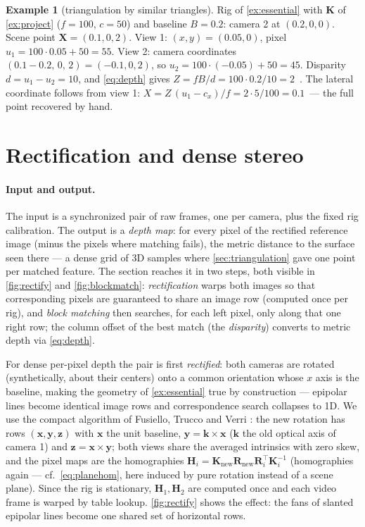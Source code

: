 \documentclass[11pt]{article}
\theoremstyle{definition}
\newtheorem{example}{Example}
\newcommand{\mat}[1]{\mathbf{#1}}
\newcommand{\vect}[1]{\mathbf{#1}}
\newcommand{\R}{\mat{R}}
\newcommand{\K}{\mat{K}}
\newcommand{\X}{\vect{X}}
\begin{document}
\begin{example}[triangulation by similar triangles]
\label{ex:triangulate}
Rig of \autoref{ex:essential} with $\K$ of \autoref{ex:project}
($f=100$, $c=50$) and baseline $B=0.2$: camera 2 at $(0.2,0,0)$. Scene
point $\X=(0.1,0,2)$.
View 1: $(x,y)=(0.05,0)$, pixel $u_1=100\cdot0.05+50=55$.
View 2: camera coordinates $(0.1-0.2,\,0,\,2)=(-0.1,0,2)$, so
$u_2=100\cdot(-0.05)+50=45$.
Disparity $d=u_1-u_2=10$, and \eqref{eq:depth} gives
$Z = fB/d = 100\cdot0.2/10 = 2$~\checkmark. The lateral coordinate follows
from view 1: $X = Z\,(u_1-c_x)/f = 2\cdot5/100 = 0.1$~\checkmark --- the
full point recovered by hand.
\end{example}

\section{Rectification and dense stereo}
\label{sec:stereo}

\paragraph{Input and output.} The input is a synchronized pair of raw
frames, one per camera, plus the fixed rig calibration. The output is a
\emph{depth map}: for every pixel of the rectified reference image
(minus the pixels where matching fails), the metric distance to the
surface seen there --- a dense grid of 3D samples where
\autoref{sec:triangulation} gave one point per matched feature. The
section reaches it in two steps, both visible in
\autoref{fig:rectify} and \autoref{fig:blockmatch}: \emph{rectification}
warps both images so that corresponding pixels are guaranteed to share
an image row (computed once per rig), and \emph{block matching} then
searches, for each left pixel, only along that one right row; the column
offset of the best match (the \emph{disparity}) converts to metric depth
via \eqref{eq:depth}.

For dense per-pixel depth the pair is first \emph{rectified}: both cameras
are rotated (synthetically, about their centers) onto a common orientation
whose $x$ axis is the baseline, making the geometry of
\autoref{ex:essential} true by construction --- epipolar lines become
identical image rows and correspondence search collapses to 1D. We use the
compact algorithm of Fusiello, Trucco and Verri \cite{Fusiello2000}: the new
rotation has rows $(\vect{x},\vect{y},\vect{z})$ with $\vect{x}$ the unit
baseline, $\vect{y}=\vect{k}\times\vect{x}$ ($\vect{k}$ the old optical axis
of camera 1) and $\vect{z}=\vect{x}\times\vect{y}$; both views share the
averaged intrinsics with zero skew, and the pixel maps are the homographies
$\mat{H}_i = \K_{\mathrm{new}}\R_{\mathrm{new}}\R_i^{\!\top}\K_i^{-1}$
(homographies again --- cf.~\eqref{eq:planehom}, here induced by pure
rotation instead of a scene plane). Since the rig is stationary,
$\mat{H}_1,\mat{H}_2$ are computed once and each video frame is warped by
table lookup. \autoref{fig:rectify} shows the effect: the fans of
slanted epipolar lines become one shared set of horizontal rows.
\end{document}

